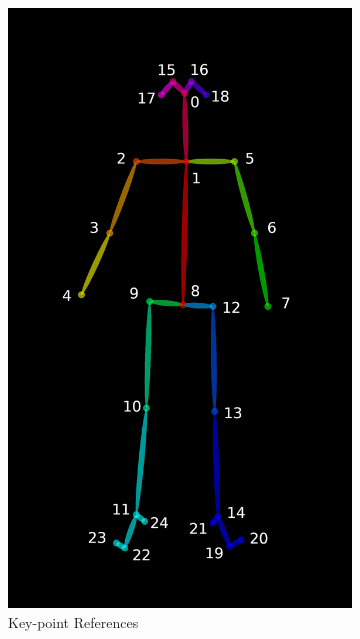 \begin{figure}[ht]
\begin{subfigure}[b]{.32\textwidth}
        \includegraphics[width=0.765\linewidth]{img/chapter5_implementation/keypoints_pose_25.png}
        \caption{Key-point References}
    \end{subfigure}
    \hspace{\fill} 
    \begin{subfigure}[b]{.32\textwidth}
        \centering

\end{subfigure}
\end{figure}
